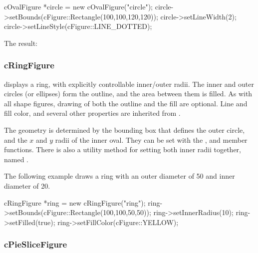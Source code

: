 \begin{cpp}
cOvalFigure *circle = new cOvalFigure("circle");
circle->setBounds(cFigure::Rectangle(100,100,120,120));
circle->setLineWidth(2);
circle->setLineStyle(cFigure::LINE_DOTTED);
\end{cpp}


The result:

\begin{center}

\end{center}


\subsubsection{cRingFigure}
\label{sec:graphics:ringfigure}

 displays a ring, with explicitly controllable
inner/outer radii. The inner and outer circles (or ellipses) form the
outline, and the area between them is filled. As with all shape figures,
drawing of both the outline and the fill are optional. Line and fill color,
and several other properties are inherited from
.

The geometry is determined by the bounding box that defines the outer
circle, and the $x$ and $y$ radii of the inner oval. They can be set with
the ,  and 
member functions. There is also a utility method for setting both
inner radii together, named .

The following example draws a ring with an outer diameter of 50 and
inner diameter of 20.

\begin{cpp}
cRingFigure *ring = new cRingFigure("ring");
ring->setBounds(cFigure::Rectangle(100,100,50,50));
ring->setInnerRadius(10);
ring->setFilled(true);
ring->setFillColor(cFigure::YELLOW);
\end{cpp}


\begin{center}

\end{center}


\subsubsection{cPieSliceFigure}
\label{sec:graphics:pieslicefigure}

